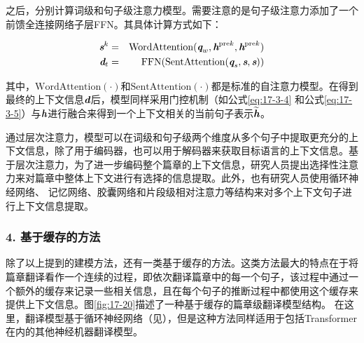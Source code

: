 \noindent 之后，分别计算词级和句子级注意力模型。需要注意的是句子级注意力添加了一个前馈全连接网络子层FFN。其具体计算方式如下：

\begin{eqnarray}
\textbf{\em s}^k&=&\textrm{WordAttention}(\textbf{\em q}_{w},\textbf{\em h}^{\textrm {pre}k},\textbf{\em h}^{\textrm{pre}k})
\label{eq:17-3-7}\\
\textbf{\em d}_t&=&\textrm{FFN}(\textrm{SentAttention}(\textbf{\em q}_{s},\textbf{\em s},\textbf{\em s}))
\label{eq:17-3-9}
\end{eqnarray}

\noindent 其中，$\textrm{WordAttention}(\cdot)$和$\textrm{SentAttention}(\cdot)$都是标准的自注意力模型。在得到最终的上下文信息$\textbf{\em d}$后，模型同样采用门控机制（如公式\eqref{eq:17-3-4} 和公式\eqref{eq:17-3-5}）与$\textbf{\em h}$进行融合来得到一个上下文相关的当前句子表示$\widetilde{\textbf{\em h}}$。

\parinterval 通过层次注意力，模型可以在词级和句子级两个维度从多个句子中提取更充分的上下文信息，除了用于编码器，也可以用于解码器来获取目标语言的上下文信息。基于层次注意力，为了进一步编码整个篇章的上下文信息，研究人员提出选择性注意力来对篇章中整体上下文进行有选择的信息提取。此外，也有研究人员使用循环神经网络、 记忆网络、胶囊网络和片段级相对注意力等结构来对多个上下文句子进行上下文信息提取。


\subsubsection{4. 基于缓存的方法}

\parinterval 除了以上提到的建模方法，还有一类基于缓存的方法。这类方法最大的特点在于将篇章翻译看作一个连续的过程，即依次翻译篇章中的每一个句子，该过程中通过一个额外的缓存来记录一些相关信息，且在每个句子的推断过程中都使用这个缓存来提供上下文信息。图\ref{fig:17-20}描述了一种基于缓存的篇章级翻译模型结构。 在这里，翻译模型基于循环神经网络（见{\chapterten}），但是这种方法同样适用于包括Transformer在内的其他神经机器翻译模型。

